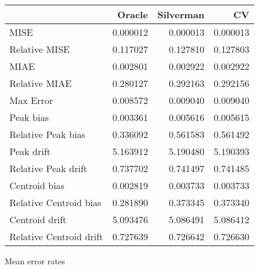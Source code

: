 \begin{tabular}{lrrr}
  \hline
 & Oracle & Silverman & CV \\ 
  \hline
MISE & 0.000012 & 0.000013 & 0.000013 \\ 
  Relative MISE & 0.117027 & 0.127810 & 0.127803 \\ 
  MIAE & 0.002801 & 0.002922 & 0.002922 \\ 
  Relative MIAE & 0.280127 & 0.292163 & 0.292156 \\ 
  Max Error & 0.008572 & 0.009040 & 0.009040 \\ 
  Peak bias & 0.003361 & 0.005616 & 0.005615 \\ 
  Relative Peak bias & 0.336092 & 0.561583 & 0.561492 \\ 
  Peak drift & 5.163912 & 5.190480 & 5.190393 \\ 
  Relative Peak drift & 0.737702 & 0.741497 & 0.741485 \\ 
  Centroid bias & 0.002819 & 0.003733 & 0.003733 \\ 
  Relative Centroid bias & 0.281890 & 0.373345 & 0.373340 \\ 
  Centroid drift & 5.093476 & 5.086491 & 5.086412 \\ 
  Relative Centroid drift & 0.727639 & 0.726642 & 0.726630 \\ 
   \hline
\end{tabular}
\caption{Mean error rates} 
